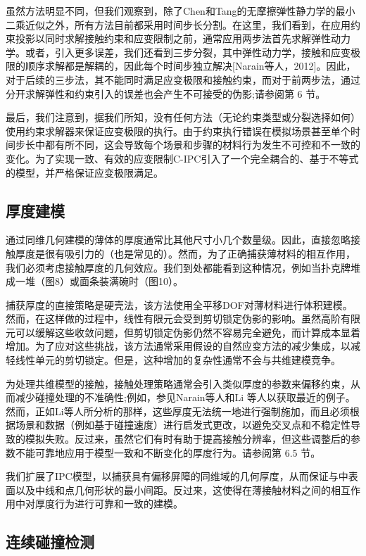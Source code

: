 虽然方法明显不同，但我们观察到，除了Chen和Tang的无摩擦弹性静力学的最小二乘近似之外，所有方法目前都采用时间步长分割。在这里，我们看到，在应用约束投影以同时求解接触约束和应变限制之前，通常应用两步法首先求解弹性动力学。或者，引入更多误差，我们还看到三步分裂，其中弹性动力学，接触和应变极限的顺序求解都是解耦的，因此每个时间步独立解决[Narain等人，2012]。因此，对于后续的三步法，其不能同时满足应变极限和接触约束，而对于前两步法，通过分开求解弹性和约束引入的误差也会产生不可接受的伪影;请参阅第 6 节。

最后，我们注意到，据我们所知，没有任何方法（无论约束类型或分裂选择如何）使用约束求解器来保证应变极限的执行。由于约束执行错误在模拟场景甚至单个时间步长中都有所不同，这会导致每个场景和步骤的材料行为发生不可控和不一致的变化。为了实现一致、有效的应变限制C-IPC引入了一个完全耦合的、基于不等式的模型，并严格保证应变极限满足。

\subsection{厚度建模}

通过同维几何建模的薄体的厚度通常比其他尺寸小几个数量级。因此，直接忽略接触厚度是很有吸引力的（也是常见的）。然而，为了正确捕获薄材料的相互作用，我们必须考虑接触厚度的几何效应。我们到处都能看到这种情况，例如当扑克牌堆成一堆（图8）或面条装满碗时（图10）。

捕获厚度的直接策略是硬壳法，该方法使用全平移DOF对薄材料进行体积建模。然而，在这样做的过程中，线性有限元会受到剪切锁定伪影的影响。虽然高阶有限元可以缓解这些收敛问题，但剪切锁定伪影仍然不容易完全避免，而计算成本显着增加。为了应对这些挑战，该方法通常采用假设的自然应变方法的减少集成，以减轻线性单元的剪切锁定。但是，这种增加的复杂性通常不会与共维建模竞争。

为处理共维模型的接触，接触处理策略通常会引入类似厚度的参数来偏移约束，从而减少碰撞处理的不准确性;例如，参见Narain等人和Li 等人以获取最近的例子。然而，正如Li等人所分析的那样，这些厚度无法统一地进行强制施加，而且必须根据场景和数据（例如基于碰撞速度）进行启发式更改，以避免交叉点和不稳定性导致的模拟失败。反过来，虽然它们有时有助于提高接触分辨率，但这些调整后的参数不能可靠地应用于模型一致和不断变化的厚度行为。请参阅第 6.5 节。

我们扩展了IPC模型，以捕获具有偏移屏障的同维域的几何厚度，从而保证与中表面以及中线和点几何形状的最小间距。反过来，这使得在薄接触材料之间的相互作用中对厚度行为进行可靠和一致的建模。

\subsection{连续碰撞检测}

